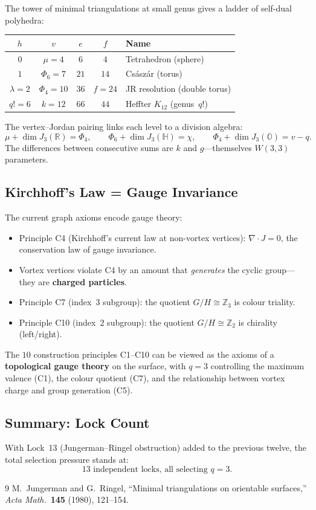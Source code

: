 The tower of minimal triangulations at small genus gives a ladder of self-dual polyhedra:
\begin{center}
\begin{tabular}{ccccl}
\hline
$h$ & $v$ & $e$ & $f$ & Name \\ \hline
$0$ & $\mu = 4$ & $6$ & $4$ & Tetrahedron (sphere) \\
$1$ & $\Phi_6 = 7$ & $21$ & $14$ & Cs\'asz\'ar (torus) \\
$\lambda = 2$ & $\Phi_4 = 10$ & $36$ & $f = 24$ & JR resolution (double torus) \\
$q! = 6$ & $k = 12$ & $66$ & $44$ & Heffter $K_{12}$ (genus~$q!$) \\
\hline
\end{tabular}
\end{center}

\noindent
The vertex--Jordan pairing links each level to a division algebra:
\[
  \mu + \dim J_3(\mathbb{R}) = \Phi_4, \qquad
  \Phi_6 + \dim J_3(\mathbb{H}) = \chi, \qquad
  \Phi_4 + \dim J_3(\mathbb{O}) = v - q.
\]
The differences between consecutive sums are $k$ and $g$---themselves $W(3,3)$ parameters.

\subsection{Kirchhoff's Law = Gauge Invariance}

The current graph axioms encode gauge theory:
\begin{itemize}
\item Principle C4 (Kirchhoff's current law at non-vortex vertices): $\nabla\cdot J = 0$, the conservation law of gauge invariance.
\item Vortex vertices violate C4 by an amount that \emph{generates} the cyclic group---they are \textbf{charged particles}.
\item Principle C7 (index~$3$ subgroup): the quotient $G/H \cong \mathbb{Z}_3$ is colour triality.
\item Principle C10 (index~$2$ subgroup): the quotient $G/H \cong \mathbb{Z}_2$ is chirality (left/right).
\end{itemize}

The $10$ construction principles C1--C10 can be viewed as the axioms of a \textbf{topological gauge theory} on the surface, with $q = 3$ controlling the maximum valence (C1), the colour quotient (C7), and the relationship between vortex charge and group generation (C5).

\subsection{Summary: Lock Count}

With Lock~13 (Jungerman--Ringel obstruction) added to the previous twelve, the total selection pressure stands at:
\[
  \boxed{13\text{ independent locks, all selecting } q = 3.}
\]

\begin{thebibliography}{9}
 M.~Jungerman and G.~Ringel, ``Minimal triangulations on orientable surfaces,'' \textit{Acta Math.}\ \textbf{145} (1980), 121--154.
\end{thebibliography}

